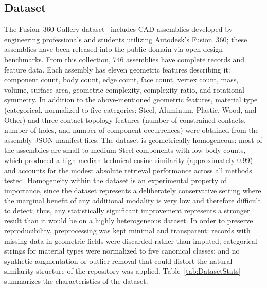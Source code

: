 \documentclass[preprint,12pt]{elsarticle}
\begin{document}
\subsection{Dataset}

The Fusion~360 Gallery dataset~\cite{Willis2021} includes CAD assemblies developed by engineering professionals and students utilizing Autodesk's Fusion~360; these assemblies have been released into the public domain via open design benchmarks.
From this collection, 746 assemblies have complete records and feature data.
Each assembly has eleven geometric features describing it: component count, body count, edge count, face count, vertex count, mass, volume, surface area, geometric complexity, complexity ratio, and rotational symmetry.
In addition to the above-mentioned geometric features, material type (categorical, normalized to five categories: Steel, Aluminum, Plastic, Wood, and Other) and three contact-topology features (number of constrained contacts, number of holes, and number of component occurrences) were obtained from the assembly JSON manifest files.
The dataset is geometrically homogeneous: most of the assemblies are small-to-medium Steel components with low body counts, which produced a high median technical cosine similarity (approximately 0.99) and accounts for the modest absolute retrieval performance across all methods tested.
Homogeneity within the dataset is an experimental property of importance, since the dataset represents a deliberately conservative setting where the marginal benefit of any additional modality is very low and therefore difficult to detect; thus, any statistically significant improvement represents a stronger result than it would be on a highly heterogeneous dataset.
In order to preserve reproducibility, preprocessing was kept minimal and transparent: records with missing data in geometric fields were discarded rather than imputed; categorical strings for material types were normalized to five canonical classes; and no synthetic augmentation or outlier removal that could distort the natural similarity structure of the repository was applied.
Table~\ref{tab:DatasetStats} summarizes the characteristics of the dataset.
\end{document}
